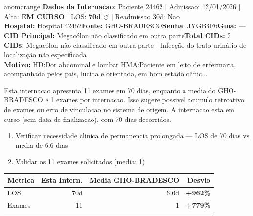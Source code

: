 \documentclass[a4paper,10pt]{article}
\begin{document}
\begin{anomalycard}[Internacao 112188 | GHO-BRADESCO | ALTO (z=4.05)]{anomorange}
\textbf{Dados da Internacao:} Paciente 24462 $\mid$ Admissao: 12/01/2026 $\mid$ Alta: \textcolor{anomorange}{\textbf{EM CURSO}} $\mid$ LOS: \textbf{70d \textcolor{anomorange}{$\circlearrowleft$}} $\mid$ Readmissao 30d: Nao\\
\textbf{Hospital:} Hospital 42452\quad\textbf{Fonte:} GHO-BRADESCO\quad\textbf{Senha:} JYGB3F6\quad\textbf{Guia:} ---\\
\textbf{CID Principal:} {\small Megacólon não classificado em outra parte}\quad\textbf{Total CIDs:} 2\\

\textbf{CIDs:} {\scriptsize Megacólon não classificado em outra parte | Infecção do trato urinário de localização não especificada}\\

\textbf{Motivo:} {\scriptsize HD:Dor abdominal e lombar  HMA:Paciente em leito de enfermaria, acompanhada pelos pais, lucida e orientada, em bom estado clínic...}\\

\vspace{2pt}\begin{tcolorbox}[colback=severityred!20,colframe=anomorange,title={\textbf{Interpretacao de Negocio}},fonttitle=\bfseries\small,left=4pt,right=4pt,top=3pt,bottom=3pt]
{\small Esta internacao apresenta 11 exames em 70 dias, enquanto a media do GHO-BRADESCO e 1 exames por internacao. Isso sugere possivel acumulo retroativo de exames ou erro de vinculacao no sistema de origem. A internacao esta em curso (sem data de finalizacao), com 70 dias decorridos.}
\end{tcolorbox}
\begin{tcolorbox}[colback=severityyellow!30,colframe=anomorange,title={\textbf{Recomendacoes Especificas}},fonttitle=\bfseries\small,left=4pt,right=4pt,top=3pt,bottom=3pt]
\begin{enumerate}[nosep,leftmargin=16pt]
\item {\small Verificar necessidade clinica de permanencia prolongada --- LOS de 70 dias vs media de 6.6 dias}
\item {\small Validar os 11 exames solicitados (media: 1)}
\end{enumerate}
\end{tcolorbox}
\begin{center}\begin{tabular}{l r r r}\toprule\textbf{Metrica} & \textbf{Esta Intern.} & \textbf{Media GHO-BRADESCO} & \textbf{Desvio} \\\midrule
LOS & 70d & 6.6d & \textcolor{anomred}{\textbf{+962\%}} \\
Exames & 11 & 1 & \textcolor{anomred}{\textbf{+779\%}} \\
\bottomrule\end{tabular}\end{center}


\end{anomalycard}
\end{document}
